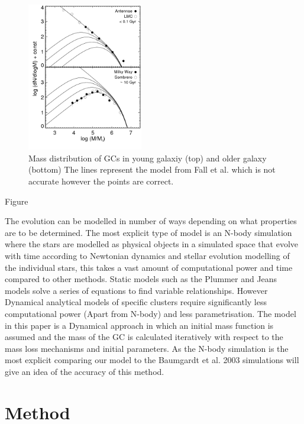 \documentclass[%
 aip,
 jmp,%
 amsmath,amssymb,
 reprint,%
]{revtex4-1}
\begin{document}
\begin{figure}[H]
\centering
\includegraphics[width=0.45\textwidth]{GCmassfunction.png}
\caption{Mass distribution of GCs in young galaxiy (top) and older galaxy (bottom) The lines represent the model from Fall et al.\cite{Fall2009} which is not accurate however the points are correct. }
\label{massfunction}
\end{figure}

Figure \cite{massfunction} 

The evolution can be modelled in number of ways depending on what properties are to be determined.  The most explicit type of model is an N-body simulation where the stars are modelled as physical objects in a simulated space that evolve with time according to Newtonian dynamics and stellar evolution modelling of the individual stars, this takes a vast amount of computational power and time compared to other methods. Static models such as the Plummer and Jeans models solve a series of equations to find variable relationships. However Dynamical analytical models of specific clusters require significantly less computational power (Apart from N-body) and less parametrisation. The model in this paper is a Dynamical approach in which an initial mass function is assumed and the mass of the GC is calculated iteratively with respect to the mass loss mechanisms and initial parameters. As the N-body simulation is the most explicit comparing our model to the Baumgardt et al. 2003 simulations will give an idea of the accuracy of this method.





\section{\label{sec:level1}Method}
\end{document}
